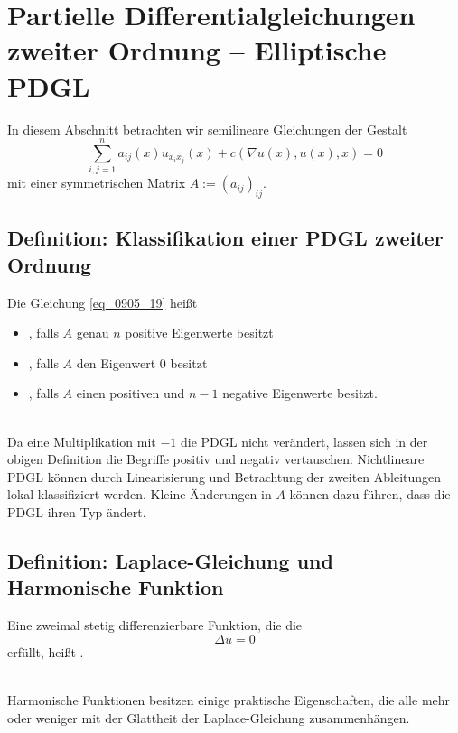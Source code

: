 \section{Partielle Differentialgleichungen zweiter Ordnung -- Elliptische PDGL}
\label{sec:para7}
	In diesem Abschnitt betrachten wir semilineare Gleichungen der Gestalt 
	\begin{equation}
		\sum\limits_{i,j=1}^{n} a_{ij}(x) u_{x_ix_j}(x) + c(\nabla u(x),u(x),x) = 0 \label{eq_0905_19}
	\end{equation}
	mit einer symmetrischen Matrix $A := (a_{ij})_{ij}$.
	
\subsection{Definition: Klassifikation einer PDGL zweiter Ordnung}
\label{def_36}
	Die Gleichung \eqref{eq_0905_19} heißt \marginnote{[36]} \begin{itemize}
		\item {}, falls $A$ genau $n$ positive Eigenwerte besitzt
		\item {}, falls $A$ den Eigenwert $0$ besitzt
		\item {}, falls $A$ einen positiven und $n-1$ negative Eigenwerte besitzt.
	\end{itemize}
	
\mbox{} \\
Da eine Multiplikation mit $-1$ die PDGL nicht verändert, lassen sich in der obigen Definition die Begriffe positiv und negativ vertauschen. Nichtlineare PDGL können durch Linearisierung und Betrachtung der zweiten Ableitungen lokal klassifiziert werden. Kleine Änderungen in $A$ können dazu führen, dass die PDGL ihren Typ ändert.

\subsection{Definition: Laplace-Gleichung und Harmonische Funktion}
\label{sub:def_37} \label{sub:def_harmonische_fkt}
	Eine zweimal stetig differenzierbare Funktion, die die 
	\begin{equation}
		\Delta u = 0 \label{eq_1305_20}
	\end{equation}
	erfüllt, heißt .
	
\mbox{} \\
Harmonische Funktionen besitzen einige praktische Eigenschaften, die alle mehr oder weniger mit der Glattheit der Laplace-Gleichung zusammenhängen.

